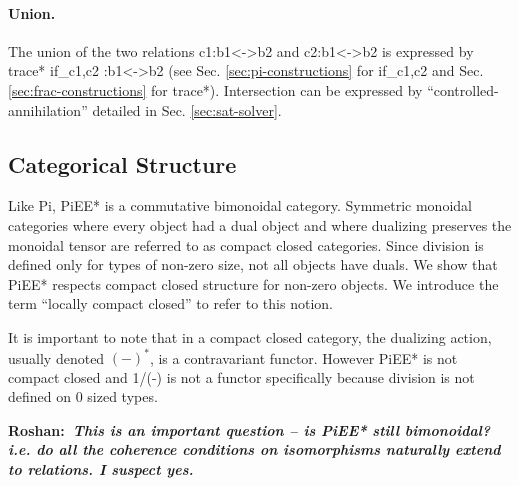 \documentclass[preprint]{sigplanconf}
\newcommand{\xcomment}[2]{\textbf{#1:~\textsl{#2}}}
\newcommand{\roshan}[1]{\xcomment{Roshan}{#1}}
\newcommand{\asterix}[0]{*}
\begin{document}

\paragraph*{Union.}
The union of the two relations {{c1:b1<->b2}} and {{c2:b1<->b2}} is
expressed by {{trace* if_{c1,c2} :b1<->b2}} (see Sec.
\ref{sec:pi-constructions} for {{if_{c1,c2} }} and
Sec. \ref{sec:frac-constructions} for {{trace*}}). Intersection can be
expressed by ``controlled-annihilation'' detailed in
Sec. \ref{sec:sat-solver}.


\subsection{Categorical Structure}

Like {{Pi}}, {{PiEE*}} is a commutative bimonoidal category.
Symmetric monoidal categories where every object had a dual object and
where dualizing preserves the monoidal tensor are referred to as
compact closed categories. Since division is defined only for types of
non-zero size, not all objects have duals.  We show that {{PiEE*}}
respects compact closed structure for non-zero objects. We introduce
the term ``locally compact closed'' to refer to this notion.

It is important to note that in a compact closed category, the
dualizing action, usually denoted $(-)^\asterix$, is a contravariant
functor. However {{PiEE*}} is not compact closed and {{1/(-)}} is not
a functor specifically because division is not defined on 0 sized
types.

\roshan{This is an important question -- is {{PiEE*}} still
  bimonoidal? i.e. do all the coherence conditions on isomorphisms
  naturally extend to relations. I suspect yes.}
\end{document}
